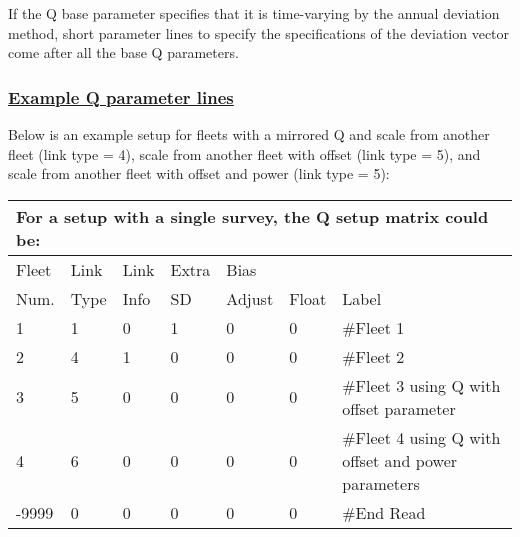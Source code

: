 If the Q base parameter specifies that it is time-varying by the annual deviation method, short parameter lines to specify the specifications of the deviation vector come after all the base Q parameters.

\hypertarget{QParams}{}
\subsubsection[Example Q parameter lines]{\protect\hyperlink{QParams}{Example Q parameter lines}}
Below is an example setup for fleets with a mirrored Q and scale from another fleet (link type = 4), scale from another fleet with offset (link type = 5), and scale from another fleet with offset and power (link type = 5):
\begin{longtable}{p{1cm} p{1cm} p{1cm} p{1cm} p{1cm} p{1cm} p{7.6cm}}
	\multicolumn{7}{l}{For a setup with a single survey, the Q setup matrix could be:} \\
	\hline
	Fleet \Tstrut & Link & Link & Extra & Bias   & & \\
	Num.          & Type & Info & SD    & Adjust & Float & Label \Bstrut\\
	\hline
	1 & 1 & 0 & 1 & 0 & 0 & \#Fleet 1 \Tstrut\\
	2 & 4 & 1 & 0 & 0 & 0 & \#Fleet 2 \\
	3 & 5 & 0 & 0 & 0 & 0 & \#Fleet 3 using Q with offset parameter \\
    4 & 6 & 0 & 0 & 0 & 0 & \#Fleet 4 using Q with offset and power parameters \\
	-9999 & 0 & 0 & 0 & 0 & 0 & \#End Read \Bstrut\\
	\hline
\end{longtable}



